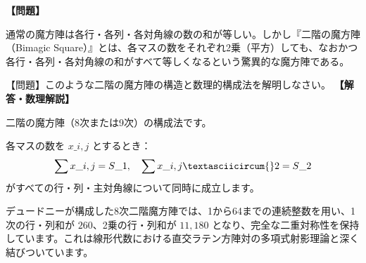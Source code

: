 \documentclass[10pt,a4paper,oneside,openany]{ltjsbook}
\begin{document}
\begin{tcolorbox}[colback=softblue,colframe=primaryblue,title=\textbf{第 408 問：二階の魔方陣（二重直交多重方陣） （原題: MAGIC SQUARES OF TWO DEGREES.）},arc=2mm,boxrule=1pt,breakable]
\textbf{【問題】}\par\vspace{0.3em}
通常の魔方陣は各行・各列・各対角線の数の和が等しい。しかし『二階の魔方陣（Bimagic Square）』とは、各マスの数をそれぞれ2乗（平方）しても、なおかつ各行・各列・各対角線の和がすべて等しくなるという驚異的な魔方陣である。

【問題】このような二階の魔方陣の構造と数理的構成法を解明しなさい。
\tcblower
\textbf{【解答・数理解説】}\par\vspace{0.3em}
二階の魔方陣（8次または9次）の構成法です。

各マスの数を $x\_{i,j}$ とするとき：
\[ \sum x\_{i,j} = S\_1, \quad \sum x\_{i,j}\textasciicircum{}2 = S\_2 \]
がすべての行・列・主対角線について同時に成立します。

デュードニーが構成した8次二階魔方陣では、1から64までの連続整数を用い、1次の行・列和が $260$、2乗の行・列和が $11,180$ となり、完全な二重対称性を保持しています。これは線形代数における直交ラテン方陣対の多項式射影理論と深く結びついています。
\end{tcolorbox}
\end{document}
